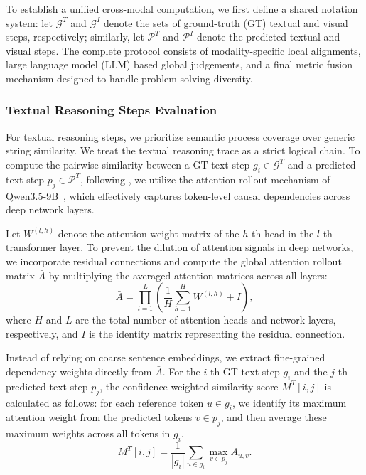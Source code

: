 \documentclass[11pt]{article}
\begin{document}
To establish a unified cross-modal computation, we first define a shared notation system: let $\mathcal{G}^T$ and $\mathcal{G}^I$ denote the sets of ground-truth (GT) textual and visual steps, respectively; similarly, let $\mathcal{P}^T$ and $\mathcal{P}^I$ denote the predicted textual and visual steps. The complete protocol consists of modality-specific local alignments, large language model (LLM) based global judgements, and a final metric fusion mechanism designed to handle problem-solving diversity.

\subsubsection{\textbf{Textual Reasoning Steps Evaluation}}
\label{sec:eval_text}

For textual reasoning steps, we prioritize semantic process coverage over generic string similarity. We treat the textual reasoning trace as a strict logical chain. To compute the pairwise similarity between a GT text step $g_i \in \mathcal{G}^T$ and a predicted text step $p_j \in \mathcal{P}^T$, following \citet{DBLP:conf/acl/AbnarZ20}, we utilize the attention rollout mechanism of Qwen3.5-9B~\cite{qwen2026qwen35}, which effectively captures token-level causal dependencies across deep network layers.

Let $W^{(l,h)}$ denote the attention weight matrix of the $h$-th head in the $l$-th transformer layer. To prevent the dilution of attention signals in deep networks, we incorporate residual connections and compute the global attention rollout matrix $\bar{A}$ by multiplying the averaged attention matrices across all layers:
\begin{equation}
\bar{A} = \prod_{l=1}^{L} \left( \frac{1}{H} \sum_{h=1}^{H} W^{(l,h)} + I \right),
\end{equation}
where $H$ and $L$ are the total number of attention heads and network layers, respectively, and $I$ is the identity matrix representing the residual connection.

Instead of relying on coarse sentence embeddings, we extract fine-grained dependency weights directly from $\bar{A}$. For the $i$-th GT text step $g_i$ and the $j$-th predicted text step $p_j$, the confidence-weighted similarity score $M^T[i,j]$ is calculated as follows: for each reference token $u \in g_i$, we identify its maximum attention weight from the predicted tokens $v \in p_j$, and then average these maximum weights across all tokens in $g_i$.
\begin{equation}
M^T[i,j] = \frac{1}{|g_i|} \sum_{u \in g_i} \max_{v \in p_j} \bar{A}_{u,v}.
\end{equation}
\end{document}
